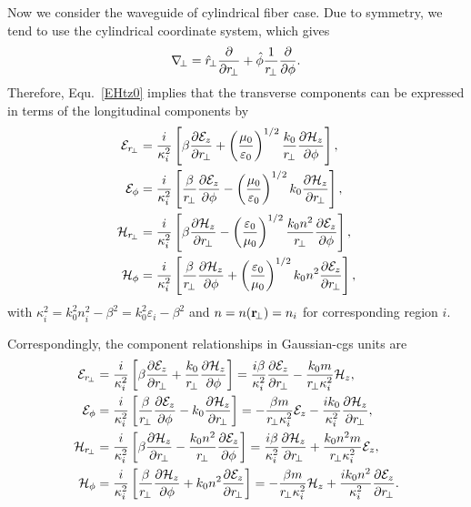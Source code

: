 Now we consider the waveguide of cylindrical fiber case. Due to symmetry, we tend to use the 
cylindrical coordinate system, which gives 
\begin{align}
\nabla\!_\perp = \hat{r}\!_\perp \frac{\partial {}}{\partial {r\!_\perp}} + \hat{\phi} \frac{1}{r\!_\perp} \frac{\partial {}}{\partial {\phi}}.
\end{align}
Therefore, Equ.~\ref{EHtz0} implies that the transverse components can be expressed in terms of the 
longitudinal components by
\begin{subequations}
\begin{align}
\mathcal{E}_{r\!_\perp} &= \frac{i}{\kappa_i^2} \left[ \beta \pp{\mathcal{E}_z }{r\!_\perp} + 
\left(\frac{\mu_0}{\varepsilon_0} \right)^{1/2}  \frac{k_0}{r\!_\perp} 
\pp{\mathcal{H}_z}{\phi} \right], \\
\mathcal{E}_\phi &= \frac{i}{\kappa_i^2} \left[\frac{\beta}{r\!_\perp} 
\pp{\mathcal{E}_z}{\phi} -\left(\frac{\mu_0}{\varepsilon_0} \right) ^{1/2} k_0 
\pp{\mathcal{H}_z}{r\!_\perp} 
\right],\\
\mathcal{H}_{r\!_\perp} &= \frac{i}{\kappa_i^2} \left[ \beta \pp{\mathcal{H}_z}{r\!_\perp} 
-\left(\frac{\varepsilon_0}{\mu_0} \right)^{1/2} \frac{k_0n^2}{r\!_\perp}\pp{\mathcal{E}_z}{\phi} \right],\\
\mathcal{H}_\phi &= \frac{i}{\kappa_i^2} \left[ \frac{\beta}{r\!_\perp} \pp{\mathcal{H}_z}{\phi} + 
\left(\frac{\varepsilon_0}{\mu_0} \right)^{1/2} k_0n^2 \pp{\mathcal{E}_z}{r\!_\perp} \right],
\end{align}
\end{subequations}
with $ \kappa_i^2= k_0^2n_i^2-\beta^2=k_0^2 \varepsilon_i -\beta^2  $ and $ n=n(\mathbf{r}\!_\perp)=n_i$ for corresponding region $i$. 

Correspondingly, the component relationships in Gaussian-cgs units are
\begin{subequations}\label{EHzgauss}
\begin{align}
\mathcal{E}_{r\!_\perp} &= \frac{i}{\kappa_i^2} \left[ \beta \pp{\mathcal{E}_z }{r\!_\perp} + 
  \frac{k_0}{r\!_\perp} 
\pp{\mathcal{H}_z}{\phi} \right]= \frac{i\beta}{\kappa_i^2} \pp{\mathcal{E}_z }{r\!_\perp} - 
  \frac{k_0m}{r\!_\perp \kappa_i^2} {\mathcal{H}_z}, \\
\mathcal{E}_\phi &= \frac{i}{\kappa_i^2} \left[\frac{\beta}{r\!_\perp} 
\pp{\mathcal{E}_z}{\phi} - k_0 
\pp{\mathcal{H}_z}{r\!_\perp} 
\right] = -\frac{\beta m}{r\!_\perp \kappa_i^2} 
{\mathcal{E}_z} - \frac{ik_0}{\kappa_i^2} 
\pp{\mathcal{H}_z}{r\!_\perp},\\
\mathcal{H}_{r\!_\perp} &= \frac{i}{\kappa_i^2} \left[ \beta \pp{\mathcal{H}_z}{r\!_\perp} 
- \frac{k_0n^2}{r\!_\perp}\pp{\mathcal{E}_z}{\phi} \right]= \frac{i\beta}{\kappa_i^2} \pp{\mathcal{H}_z}{r\!_\perp} 
+ \frac{k_0n^2m}{r\!_\perp \kappa_i^2} {\mathcal{E}_z},\\
\mathcal{H}_\phi &= \frac{i}{\kappa_i^2} \left[ \frac{\beta}{r\!_\perp} \pp{\mathcal{H}_z}{\phi} + 
 k_0n^2 \pp{\mathcal{E}_z}{r\!_\perp} \right] = -\frac{\beta m}{r\!_\perp \kappa_i^2} {\mathcal{H}_z} + 
  \frac{ik_0n^2}{\kappa_i^2} \pp{\mathcal{E}_z}{r\!_\perp}.
\end{align}
\end{subequations}



